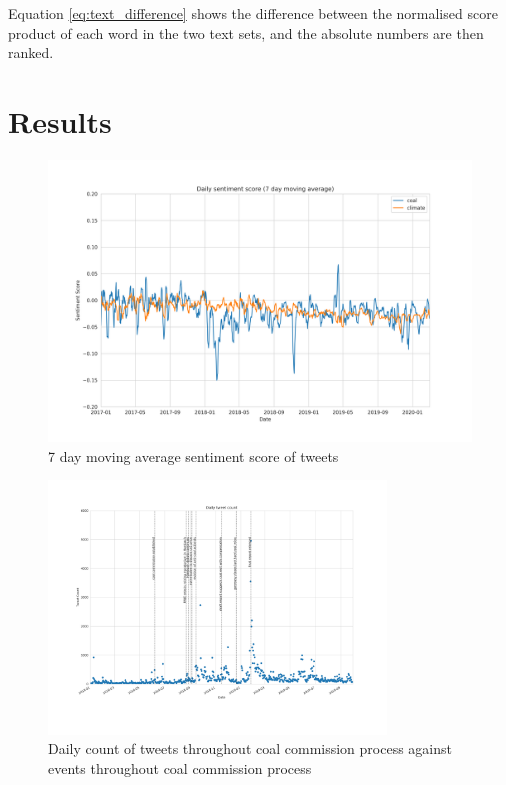 \documentclass[10pt,twocolumn,twoside]{layout}
\begin{document}
Equation \ref{eq:text_difference} shows the difference between the normalised score product of each word in the two text sets, and the absolute numbers are then ranked. 

 

\section*{Results} \label{sec:results}

\begin{figure} 
	\begin{center}
		\includegraphics[width=\linewidth]{figures/dailyavgsenti_7dma_baseline}
	\end{center}
	\caption{7 day moving average sentiment score of tweets}
	\label{fig:tweet_score}
\end{figure}

\begin{figure}[tp]
	\begin{center}
		\includegraphics[width=0.8\textwidth]{figures/tweet_count_event_timeline}
	\end{center}
	\caption{Daily count of tweets throughout coal commission process against events throughout coal commission process}
	\label{fig:tweet_count_event_timeline}
\end{figure}
\end{document}
